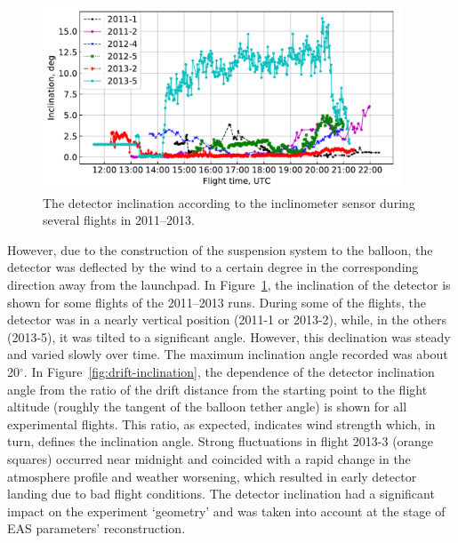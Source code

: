 \documentclass[universe,article,accept,moreauthors,pdftex]{Definitions/mdpi}
\begin{document}
\begin{figure}[H]
       \includegraphics[width=0.95\textwidth]{Telemetry_inclination.pdf}
       \caption{The detector inclination according to the inclinometer sensor during several flights in 2011--2013.}
       \label{fig:inclination} 
       \end{figure}
      








However, due to the construction of the suspension system to the balloon, the detector was deflected by the wind to a certain degree in the corresponding direction away from the launchpad. In Figure~\ref{fig:inclination}, the inclination of the detector is shown for some flights of the 2011--2013 runs. During some of the flights, the detector was in a nearly vertical position (2011-1 or 2013-2), while, in the others (2013-5), it was tilted to a significant angle. However, this declination was steady and varied slowly over time. The maximum inclination angle recorded was about 20$^\circ$. In Figure~\ref{fig:drift-inclination}, the dependence of the detector inclination angle from the ratio of the drift distance from the starting point to the flight altitude (roughly the tangent of the balloon tether angle) is shown for all experimental flights. This ratio, as expected, indicates wind strength which, in turn, defines the inclination angle. Strong fluctuations in flight 2013-3 (orange squares) occurred near midnight and coincided with a rapid change in the atmosphere profile and weather worsening, which resulted in early detector landing due to bad flight conditions. The detector inclination had a significant impact on the experiment `geometry' and was taken into account at the stage of EAS parameters' reconstruction.
\end{document}
